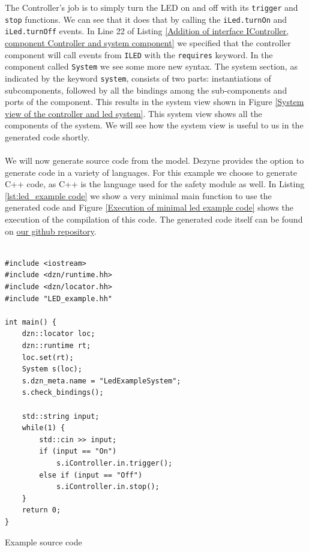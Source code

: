 \documentclass[12pt]{scrreprt}
\begin{document}
The Controller's job is to simply turn the LED on and off with its \texttt{trigger} and \texttt{stop} functions. We can see that it does that by calling the \texttt{iLed.turnOn} and \texttt{iLed.turnOff} events. In Line 22 of Listing \ref{Addition of interface IController, component Controller and system component} we specified that the controller component will call events from \texttt{ILED} with the \texttt{requires} keyword. In the component called \texttt{System} we see some more new syntax.  The system section, as indicated by the keyword \texttt{system}, consists of two parts: instantiations of subcomponents, followed by all the bindings among the sub-components and ports of the component. This results in the system view shown in  Figure \ref{System view of the controller and led system}. This system view shows all the components of the system. We will see how the system view is useful to us in the generated code shortly.
\\\\
We will now generate source code from the model. Dezyne provides the option to generate code in a variety of languages. For this example we choose to generate C++ code, as C++ is the language used for the safety module as well. In Listing \ref{lst:led_example code} we show a very minimal main function to use the generated code and Figure \ref{Execution of minimal led example code} shows the execution of the compilation of this code. The generated code itself can be found on \href{https://github.com/Yousousen/safety-module-for-care-robot-rose.git}{our github repository}.

\begin{listing}[ht]
\begin{verbatim}
               
#include <iostream>
#include <dzn/runtime.hh>
#include <dzn/locator.hh>
#include "LED_example.hh"

int main() {
    dzn::locator loc;
    dzn::runtime rt;
    loc.set(rt);
    System s(loc);
    s.dzn_meta.name = "LedExampleSystem";
    s.check_bindings();

    std::string input;
    while(1) {
        std::cin >> input;
        if (input == "On")
            s.iController.in.trigger();
        else if (input == "Off")
            s.iController.in.stop();
    }
    return 0;
}

\end{verbatim}
\caption{Example source code}
\label{lst:led_example code}
\end{listing}
\end{document}
